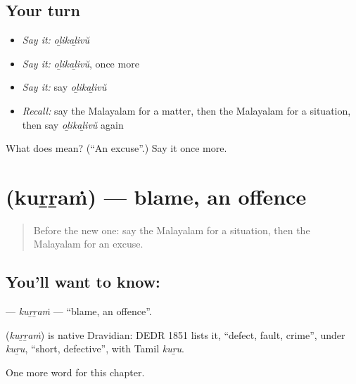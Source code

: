 \subsection*{Your turn}
\begin{itemize}
\raggedright
  \item \emph{Say it:} \emph{oḻikaḻivŭ}
  \item \emph{Say it:} \emph{oḻikaḻivŭ}, once more
  \item \emph{Say it:} say \emph{oḻikaḻivŭ}
  \item \emph{Recall:} say the Malayalam for a matter, then the Malayalam for a situation, then say \emph{oḻikaḻivŭ} again
\end{itemize}

\begin{tcolorbox}[breakable,colback=teal!4,colframe=teal!35!black,title={Before you move on}]
What does  mean? (\textquotedblleft{}An excuse\textquotedblright{}.) Say it once more.
\end{tcolorbox}
\section[\texorpdfstring{\ml{കുറ്റം} (kuṟṟaṁ)}{കുറ്റം (kuṟṟaṁ)}]{ (kuṟṟaṁ) — blame, an offence}

\label{lesson:ML-C243-kurram}



\begin{quote}
Before the new one: say the Malayalam for a situation, then the Malayalam for an excuse.
\end{quote}

\subsection*{You'll want to know: }
\textbf{} — \emph{kuṟṟaṁ} — \textquotedblleft{}blame, an offence\textquotedblright{}.

\begin{cousinweb}
\textbf{} (\emph{kuṟṟaṁ}) is native Dravidian: DEDR 1851 lists it, \textquotedblleft{}defect, fault, crime\textquotedblright{}, under \emph{kuṟu}, \textquotedblleft{}short, defective\textquotedblright{}, with Tamil \emph{kuṟu}.
\end{cousinweb}

\begin{grammarlens}[title={What you've built}]
One more word for this chapter.
\end{grammarlens}

